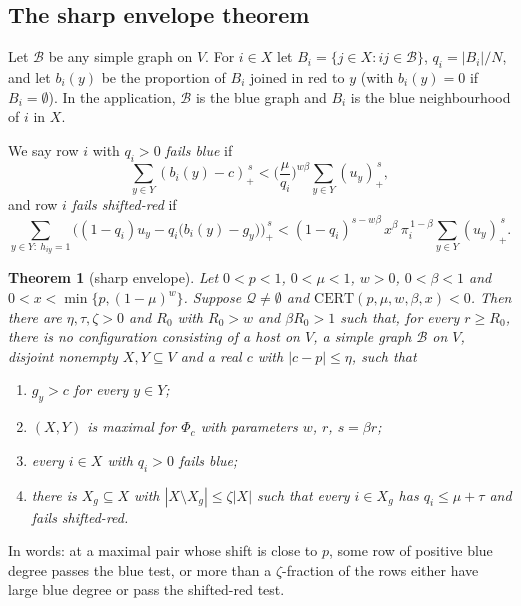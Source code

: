 \documentclass[11pt]{article}
\newtheorem{theorem}{Theorem}[section]
\theoremstyle{definition}
\theoremstyle{remark}
\newcommand{\cert}{\mathrm{CERT}}
\newcommand{\feas}{\mathcal Q}
\begin{document}
\subsection{The sharp envelope theorem}

Let $\mathcal B$ be any simple graph on $V$. For $i\in X$ let $B_i=\{j\in X:ij\in\mathcal B\}$, $q_i=|B_i|/N$, and let
$b_i(y)$ be the proportion of $B_i$ joined in red to $y$ (with $b_i(y)=0$ if $B_i=\emptyset$). In the application,
$\mathcal B$ is the blue graph and $B_i$ is the blue neighbourhood of $i$ in $X$.

We say row $i$ with $q_i>0$ \emph{fails blue} if
\begin{equation}\label{eq:B}
\sum_{y\in Y}(b_i(y)-c)_+^{\,s}<\Big(\frac\mu{q_i}\Big)^{w\beta}\sum_{y\in Y}(u_y)_+^{\,s},
\end{equation}
and row $i$ \emph{fails shifted-red} if
\begin{equation}\label{eq:R}
\sum_{y\in Y:\ h_{iy}=1}\Big((1-q_i)u_y-q_i\big(b_i(y)-g_y\big)\Big)_+^{\,s}
<(1-q_i)^{s-w\beta}\,x^\beta\,\pi_i^{\,1-\beta}\sum_{y\in Y}(u_y)_+^{\,s}.
\end{equation}

\begin{theorem}[sharp envelope]\label{thm:envelope}
Let $0<p<1$, $0<\mu<1$, $w>0$, $0<\beta<1$ and $0<x<\min\{p,(1-\mu)^w\}$. Suppose $\feas\ne\emptyset$ and
$\cert(p,\mu,w,\beta,x)<0$. Then there are $\eta,\tau,\zeta>0$ and $R_0$ with $R_0>w$ and $\beta R_0>1$ such that,
for every $r\ge R_0$, there is no configuration consisting of a host on $V$, a simple graph $\mathcal B$ on $V$,
disjoint nonempty $X,Y\subseteq V$ and a real $c$ with $|c-p|\le\eta$, such that
\begin{enumerate}[label=(\roman*)]
\item $g_y>c$ for every $y\in Y$;
\item $(X,Y)$ is maximal for $\Phi_c$ with parameters $w$, $r$, $s=\beta r$;
\item every $i\in X$ with $q_i>0$ fails blue;
\item there is $X_g\subseteq X$ with $|X\setminus X_g|\le\zeta|X|$ such that every $i\in X_g$ has $q_i\le\mu+\tau$
and fails shifted-red.
\end{enumerate}
\end{theorem}

In words: at a maximal pair whose shift is close to $p$, some row of positive blue degree passes the blue test, or more
than a $\zeta$-fraction of the rows either have large blue degree or pass the shifted-red test.
\end{document}
